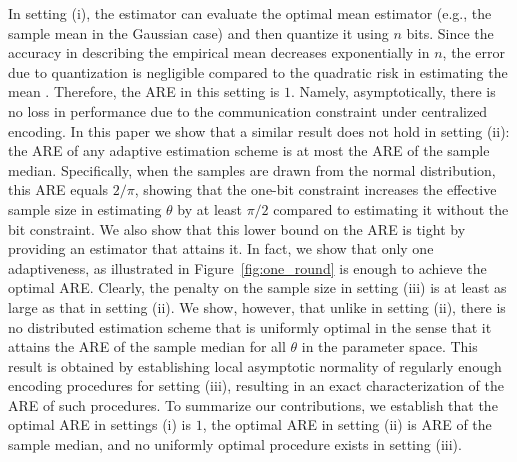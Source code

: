 In setting (i), the estimator can evaluate the optimal mean estimator (e.g., the sample mean in the Gaussian case) and then quantize it using $n$ bits. Since the accuracy in describing the empirical mean decreases exponentially in $n$, the error due to quantization is negligible compared to the quadratic risk in estimating the mean \cite{720540}. Therefore, the ARE in this setting is $1$. Namely, asymptotically, there is no loss in performance due to the communication constraint under centralized encoding. 
%
In this paper we show that a similar result does not hold in setting (ii): the ARE of any adaptive estimation scheme is at most the ARE of the sample median. Specifically, when the samples are drawn from the normal distribution, this ARE equals $2/\pi$, showing that the one-bit constraint increases the effective sample size in estimating $\theta$ by at least $\pi/2$ compared to estimating it without the bit constraint. We also show that this lower bound on the ARE is tight by providing an estimator that attains it. In fact, we show that only one adaptiveness, as illustrated in Figure~\ref{fig:one_round} is enough to achieve the optimal ARE. 
%
Clearly, the penalty on the sample size in setting (iii) is at least as large as that in setting (ii). We show, however, that unlike in setting (ii), there is no distributed estimation scheme that is uniformly optimal in the sense that it attains the ARE of the sample median for all $\theta$ in the parameter space. This result is obtained by establishing local asymptotic normality of regularly enough encoding procedures for setting (iii), resulting in an exact characterization of the ARE of such procedures. To summarize our contributions, we establish that the optimal ARE in settings (i) is $1$, the optimal ARE in setting (ii) is ARE of the sample median, and no uniformly optimal procedure exists in setting (iii). 


